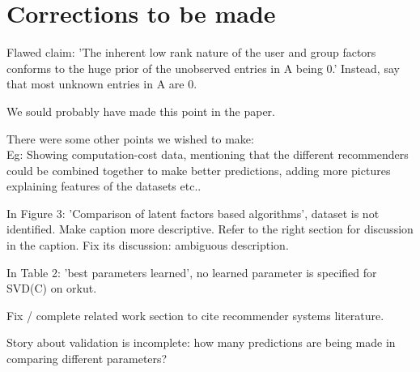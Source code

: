 \documentclass[11pt]{article}
\begin{document}
\section{Corrections to be made}
Flawed claim: 'The inherent low rank nature of the user and group factors conforms to the huge prior of the unobserved entries in A being 0.' Instead, say that most unknown entries in A are 0.

We sould probably have made this point in the paper.

There were some other points we wished to make: \\
Eg: Showing computation-cost data, mentioning that the different recommenders could be combined together to make better predictions, adding more pictures explaining features of the datasets etc..

In Figure 3: 'Comparison of latent factors based algorithms', dataset is not identified. Make caption more descriptive. Refer to the right section for discussion in the caption. Fix its discussion: ambiguous description.

In Table 2: 'best parameters learned', no learned parameter is specified for SVD(C) on orkut.

Fix / complete related work section to cite recommender systems literature.

Story about validation is incomplete: how many predictions are being made in comparing different parameters?

% 
% 
\end{document}
